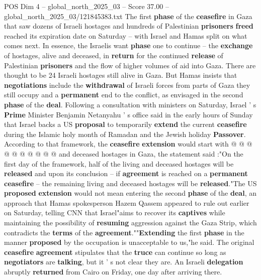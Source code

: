 \begin{textsample}{POS Dim 4 – global\_north\_2025\_03 – Score 37.00 – global\_north\_2025\_03/121845383.txt}  \label{ex:f4_pos_061}
The first \textbf{phase} of the \textbf{ceasefire} in Gaza that saw dozens of Israeli hostages and hundreds of Palestinian \textbf{prisoners} \textbf{freed} reached its expiration date on Saturday -- with Israel and Hamas split on what comes next.
In essence, the Israelis want \textbf{phase} one to continue -- the \textbf{exchange} of hostages, alive and deceased, in \textbf{return} for the continued \textbf{release} of Palestinian \textbf{prisoners} and the flow of higher volumes of aid into Gaza.
There are thought to be 24 Israeli hostages still alive in Gaza.
But Hamas insists that \textbf{negotiations} include the \textbf{withdrawal} of Israeli forces from parts of Gaza they still occupy and a \textbf{permanent} end to the conflict, as envisaged in the second \textbf{phase} of the \textbf{deal}.
Following a consultation with ministers on Saturday, Israel ' s \textbf{Prime} Minister Benjamin Netanyahu ' s office said in the early hours of Sunday that Israel backs a US \textbf{proposal} to temporarily \textbf{extend} the current \textbf{ceasefire} during the Islamic holy month of Ramadan and the Jewish holiday \textbf{Passover}.
According to that framework, the \textbf{ceasefire} \textbf{extension} would start with @ @ @ @ @ @ @ @ @ @ and deceased hostages in Gaza, the statement said :"On the first day of the framework, half of the living and deceased hostages will be \textbf{released} and upon its conclusion -- if \textbf{agreement} is reached on a \textbf{permanent} \textbf{ceasefire} -- the remaining living and deceased hostages will be \textbf{released}."The US \textbf{proposed} \textbf{extension} would not mean entering the second \textbf{phase} of the \textbf{deal}, an approach that Hamas spokesperson Hazem Qassem appeared to rule out earlier on Saturday, telling CNN that Israel"aims to recover its \textbf{captives} while maintaining the possibility of \textbf{resuming} aggression against the Gaza Strip, which contradicts the \textbf{terms} of the \textbf{agreement}.""\textbf{Extending} the first \textbf{phase} in the manner \textbf{proposed} by the occupation is unacceptable to us,"he said.
The original \textbf{ceasefire} \textbf{agreement} stipulates that the \textbf{truce} can continue so long as \textbf{negotiators} are \textbf{talking}, but it ' s not clear they are.
An Israeli \textbf{delegation} abruptly \textbf{returned} from Cairo on Friday, one day after arriving there.

\end{textsample}
